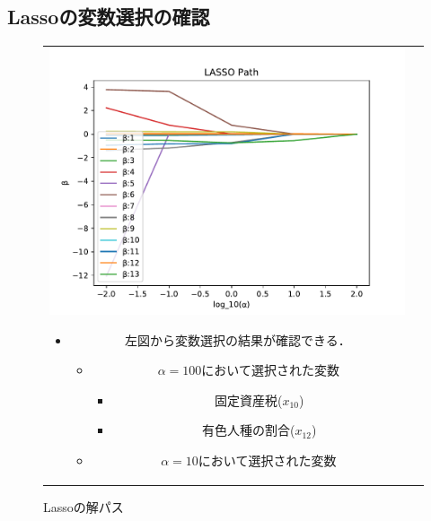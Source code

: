 \documentclass[dvipdfmx, 10pt]{beamer}
\begin{document}
\subsection{Lassoの変数選択の確認}
\begin{frame}{\insertsubsection}
    \begin{figure}[H]
            \begin{tabular}{cc}
            	 \begin{minipage}{0.5\hsize}
                   	 \includegraphics[width=1.0\linewidth]{../img/lassoPath.pdf}
            		 \caption{Lassoの解パス}
            		 \label{fig:lasso}
            	\end{minipage}
	 	\begin{minipage}{0.5\hsize}
			\begin{itemize}
                               \item 左図から変数選択の結果が確認できる．
                                   \begin{itemize}
                                       \item $\alpha=100$において選択された変数
                                        \begin{itemize}
                                            \item 固定資産税($x_{10}$)
                                            \item 有色人種の割合($x_{12}$)
                                       \end{itemize}
                                      \item $\alpha=10$において選択された変数

\end{itemize}
\end{itemize}
\end{minipage}
\end{tabular}
\end{figure}
\end{frame}
\end{document}
